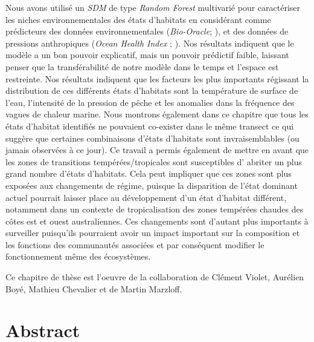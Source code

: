 \begin{refsection}
Nous avons utilisé un \emph{SDM} de type \emph{Random Forest} multivarié
pour caractériser les niches environnementales des états d'habitats en
considérant comme prédicteurs des données environnementales
(\emph{Bio-Oracle}; \textcite{Assis_2018}), et des données de pressions
anthropiques (\emph{Ocean Health Index} ; \textcite{Halpern_2019}). Nos
résultats indiquent que le modèle a un bon pouvoir explicatif, mais un
pouvoir prédictif faible, laissant penser que la transférabilité de
notre modèle dans le temps et l'espace est restreinte. Nos résultats
indiquent que les facteurs les plus importants régissant la distribution
de ces différents états d'habitats sont la température de surface de
l'eau, l'intensité de la pression de pêche et les anomalies dans la
fréquence des vagues de chaleur marine. Nous montrons également dans ce
chapitre que tous les états d'habitat identifiés ne pouvaient co-exister
dans le même transect ce qui suggère que certaines combinaisons d'états
d'habitats sont invraisemblables (ou jamais observées à ce jour). Ce
travail a permis également de mettre en avant que les zones de
transitions tempérées/tropicales sont susceptibles d' abriter un plus
grand nombre d'états d'habitats. Cela peut impliquer que ces zones sont
plus exposées aux changements de régime, puisque la disparition de
l'état dominant actuel pourrait laisser place au développement d'un état
d'habitat différent, notamment dans un contexte de tropicalisation des
zones tempérées chaudes des côtes est \autocites[
]{Verges_2014}{Verges_2019} et ouest \autocite{Wernberg_2016}
australiennes. Ces changements sont d'autant plus importants à
surveiller puisqu'ils pourraient avoir un impact important sur la
composition et les fonctions des communautés associées et par conséquent
modifier le fonctionnement même des écosystèmes.

Ce chapitre de thèse est l'oeuvre de la collaboration de Clément Violet, Aurélien Boyé, Mathieu Chevalier et de Martin Marzloff.

\clearpage

\hypertarget{abstract-chapt3}{%
\section{Abstract}\label{abstract-chapt3}}


\end{refsection}
